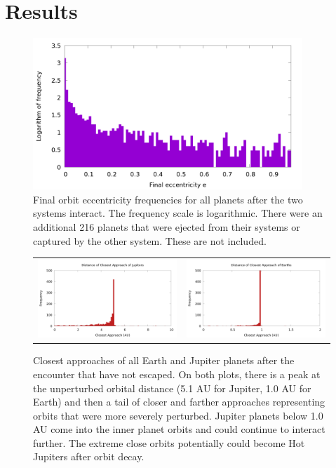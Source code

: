 \documentclass[12pt]{article}
\begin{document}
\section{Results}

    \begin{figure}[H]
        \centering
        \caption{Final orbit eccentricity frequencies for all planets 
            after the two systems interact. The frequency scale is logarithmic.
            There were an additional 216 planets that were ejected from their
            systems or captured by the other system. These are not included.}
        \includegraphics[width=4in]{eccentricity_final}
    \end{figure}

    \begin{figure}[H]
        \centering
        \caption{Closest approaches of all Earth and Jupiter planets after 
            the encounter that have not escaped. On both plots, there is a peak
            at the unperturbed orbital distance (5.1 AU for Jupiter, 1.0 AU for
            Earth) and then a tail of closer and farther approaches representing
            orbits that were more severely perturbed. Jupiter planets below 1.0 AU
            come into the inner planet orbits and could continue to interact further.
            The extreme close orbits potentially could become Hot Jupiters after
            orbit decay.
        }
        \begin{tabular}{cc}
            \includegraphics[width=3.25in]{jupiter_distance_final} &
            \includegraphics[width=3.25in]{earth_distance_final}
        \end{tabular}
    \end{figure}
\end{document}
